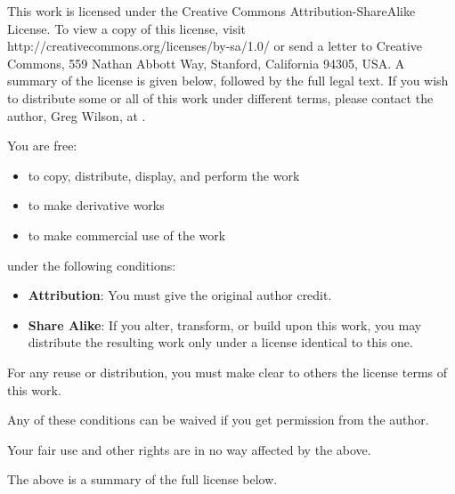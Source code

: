 \documentclass{report}
\begin{document}

This work is licensed under the Creative Commons
Attribution-ShareAlike License. To view a copy of this license, visit
http://creativecommons.org/licenses/by-sa/1.0/ or send a letter to
Creative Commons, 559 Nathan Abbott Way, Stanford, California 94305,
USA.  A summary of the license is given below, followed by the full
legal text.  If you wish to distribute some or all of this work under
different terms, please contact the author, Greg Wilson, at
.

You are free:

\begin{itemize}

  \item to copy, distribute, display, and perform the work

  \item to make derivative works

  \item to make commercial use of the work

\end{itemize}

under the following conditions:

\begin{itemize}

  \item \textbf{Attribution}: You must give the original author credit.

  \item \textbf{Share Alike}: If you alter, transform, or build upon
  this work, you may distribute the resulting work only under a
  license identical to this one.

\end{itemize}

For any reuse or distribution, you must make clear to others the
license terms of this work.

Any of these conditions can be waived if you get permission from the
author.

Your fair use and other rights are in no way affected by the above.

The above is a summary of the full license below.
\end{document}
